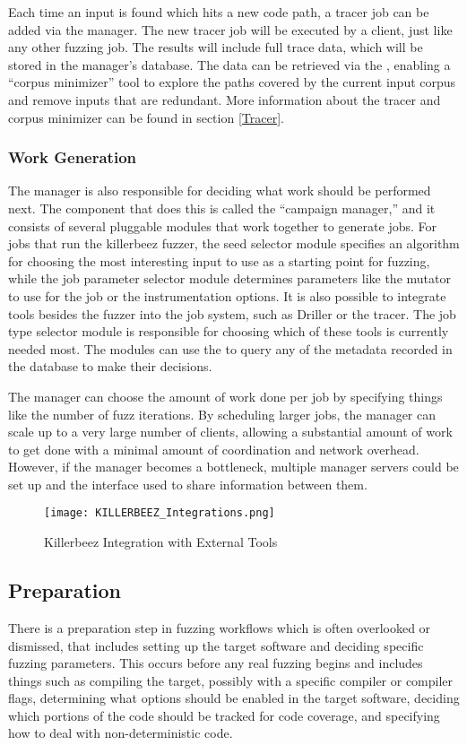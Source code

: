 Each time an input
is found which hits a new code path, a tracer job can be added via the manager.
The new tracer job will be executed by a \BOINC{} client, just like any other fuzzing job.
The results will include full trace data, which will be stored in the manager's
database.  The data can be retrieved via the \REST{} \API{}, enabling a ``corpus
minimizer'' tool to explore the paths covered by the current input corpus and
remove inputs that are redundant. More
information about the tracer and corpus minimizer can be found in section
\ref{Tracer}.

\subsubsection{Work Generation}
The manager is also responsible for deciding what work should be performed next.
The component that does this is called the ``campaign manager,'' and it consists
of several pluggable modules that work together to generate jobs. For
jobs that run the killerbeez fuzzer, the seed selector module specifies an
algorithm for choosing the most interesting input to use as a starting point for
fuzzing, while the job parameter selector module determines parameters like the
mutator to use for the job or the instrumentation options. It is also possible
to integrate tools besides the fuzzer into the job system, such as Driller or
the tracer. The job type selector module is responsible for choosing which of
these tools is currently needed most. The modules can use the \REST{} \API{} to
query any of the metadata recorded in the database to make their decisions.

The manager can choose the amount of work done per job by specifying things like the
number of fuzz iterations. By scheduling larger jobs, the manager can scale up to a very large number
of clients, allowing a substantial amount of
work to get done with a minimal amount of coordination and network overhead.
However, if the manager becomes a bottleneck, multiple
manager servers could be set up and the \REST{} \API{} interface used to share
information between them.

\begin{figure*}[!ht]
\centering
\texttt{[image: KILLERBEEZ\_Integrations.png]}
\caption{Killerbeez Integration with External Tools}
\label{fig:Killerbeez-integrations}
\end{figure*}


\subsection{Preparation}  \label{Preparation Overview}
There is a preparation step in fuzzing workflows which is often overlooked or
dismissed, that includes setting up the target software and deciding specific
fuzzing parameters. This occurs before any real fuzzing begins and includes
things such as compiling the target, possibly with a specific compiler or
compiler flags, determining what options should be enabled in the target
software, deciding which portions of the code should be tracked for code
coverage, and specifying how to deal with non-deterministic code.

